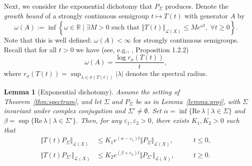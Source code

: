 \documentclass[a4paper, 12pt, oneside, reqno, notitlepage]{amsart}
\theoremstyle{plain}
\newtheorem{lemma}[theorem]{Lemma}
\theoremstyle{definition}
\theoremstyle{remark}
\begin{document}
 Next, we consider the exponential dichotomy that $P_\Sigma$ produces.
 Denote the \textit{growth bound} of a strongly continuous semigroup $t \mapsto T(t)$ with generator $A$ by  
\begin{equation}
    \omega(A) := \inf \left\{ \omega \in \mathbb{R} \; \Big| \; \exists M > 0 \text{ such that } \Vert T(t) \Vert_{\mathcal{L}(X)} \leq M e^{\omega t}, \; \forall t \geq 0 \right\}.
    \label{eq:growthbound}
\end{equation}
Note that this is well defined: $\omega(A) < \infty$ for strongly continuous semigroups.
Recall that for all $t > 0$ we have (see, e.g.,  \cite{van1996asymptotic}, Proposition 1.2.2)
\begin{equation}
    \omega(A) = \frac{\log r_\sigma(T(t))}{t},
    \label{eq:growthbound_spectralrad}
\end{equation}
where $r_\sigma(T(t)) = \sup_{\lambda \in \sigma(T(t))} |\lambda|$ denotes the spectral radius.

 \begin{lemma}[Exponential dichotomy] \label{lemma:dichotomy} 
     Assume the setting of Theorem~\ref{thm:spectrum}, and let $\Sigma$ and $P_\Sigma$ be as in Lemma~\ref{lemma:proj}, with $\Sigma$ invariant under complex conjugation and $\Sigma' \neq \emptyset$.
     Set $\alpha = \inf\{ \mathrm{Re} \, \lambda \; | \; \lambda \in \Sigma \}$ and $\beta = \sup\{ \mathrm{Re} \, \lambda \; | \; \lambda \in  \Sigma' \}$.
     Then, for any $\varepsilon_1,\varepsilon_2>0$, there exists $K_1,K_2 > 0$ such that
     \begin{subequations}\label{eq:dichotomy}
     \begin{align}
         \Vert T(t) P_\Sigma \Vert_{\mathcal{L}(X)} &\leq K_1 e^{(\alpha -\varepsilon_1)t} \Vert P_{\Sigma} \Vert_{\mathcal{L}(X)}, \qquad &t \leq 0,  \label{eq:dichotomy1}\\ 
         \Vert T(t)P_{\Sigma'} \Vert_{\mathcal{L}(X)} &\leq K_2 e^{(\beta+\varepsilon_2) t} \Vert P_{\Sigma'}\Vert_{\mathcal{L}(X)}, \qquad &t \geq 0. \label{eq:dichotomy2}
     \end{align}    
     \end{subequations}
 \end{lemma} 
\end{document}
